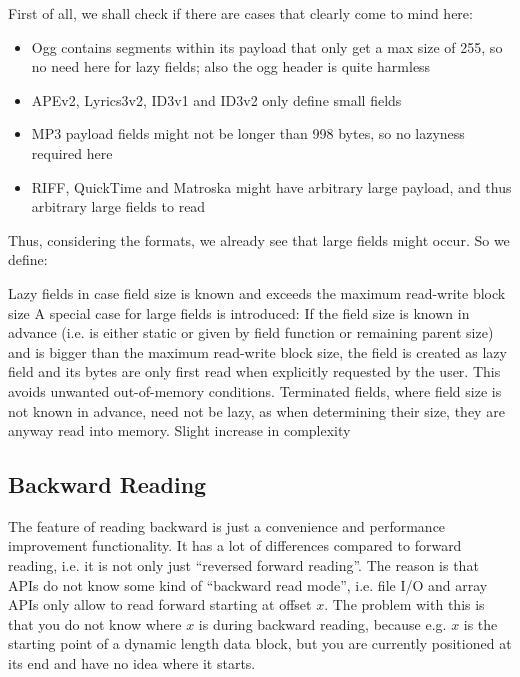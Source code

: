 First of all, we shall check if there are cases that clearly come to mind here:
\begin{itemize}
\item Ogg contains segments within its payload that only get a max size of 255, so no need here for lazy fields; also the ogg header is quite harmless
\item APEv2, Lyrics3v2, ID3v1 and ID3v2 only define small fields
\item MP3 payload fields might not be longer than 998 bytes, so no lazyness required here
\item RIFF, QuickTime and Matroska might have arbitrary large payload, and thus arbitrary large fields to read
\end{itemize}

Thus, considering the formats, we already see that large fields might occur. So we define:

{%
Lazy fields in case field size is known and exceeds the maximum read-write block size 
}
{%
A special case for large fields is introduced: If the field size is known in advance (i.e. is either static or given by field function or remaining parent size) and is bigger than the maximum read-write block size, the field is created as lazy field and its bytes are only first read when explicitly requested by the user.
}
{%
This avoids unwanted out-of-memory conditions. Terminated fields, where field size is not known in advance, need not be lazy, as when determining their size, they are anyway read into memory.
}
{%
Slight increase in complexity
}

\subsection{Backward Reading}%
\label{sec:BackwardReading}%

The feature of reading backward is just a convenience and performance improvement functionality. It has a lot of differences compared to forward reading, i.e. it is not only just ``reversed forward reading''. The reason is that APIs do not know some kind of ``backward read mode'', i.e. file I/O and array APIs only allow to read forward starting at offset $x$. The problem with this is that you do not know where $x$ is during backward reading, because e.g. $x$ is the starting point of a dynamic length data block, but you are currently positioned at its end and have no idea where it starts.

